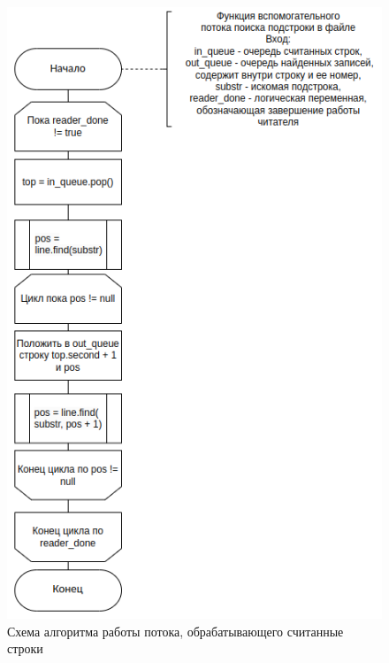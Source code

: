\begin{figure}[h]
	\centering
	\includegraphics[height=0.8\textheight]{img/thread_substr.png}
	\caption{Схема алгоритма работы потока, обрабатывающего считанные строки}
	\label{fig:parser}
\end{figure}

\clearpage

